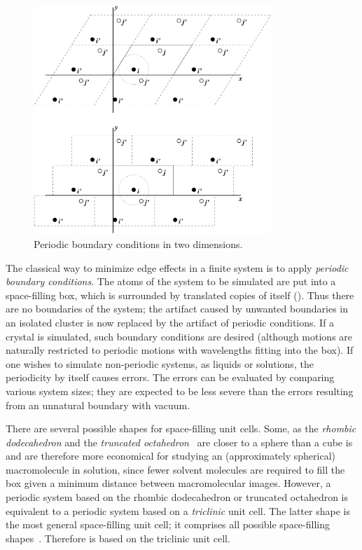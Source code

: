 \section{}
\label{sec:pbc}
\begin{figure}
\centerline{\includegraphics[width=9cm]{plots/pbctric}}
\caption {Periodic boundary conditions in two dimensions.}
\label{fig:pbc}
\end{figure}
The classical way to minimize edge effects in a finite system is to
apply {\em periodic boundary conditions}. The atoms of the system to
be simulated are put into a space-filling box, which is surrounded by
translated copies of itself ().  Thus there are no
boundaries of the system; the artifact caused by unwanted boundaries
in an isolated cluster is now replaced by the artifact of periodic
conditions. If a crystal is simulated, such boundary conditions are
desired (although motions are naturally restricted to periodic motions
with wavelengths fitting into the box). If one wishes to simulate
non-periodic systems, as liquids or solutions, the periodicity by
itself causes errors. The errors can be evaluated by comparing various
system sizes; they are expected to be less severe than the errors
resulting from an unnatural boundary with vacuum.

There are several possible shapes for space-filling unit cells. Some,
as the {\em rhombic dodecahedron} and the 
{\em truncated octahedron}~\cite{Adams79} are closer to a sphere
than a cube is and are therefore more economical for
studying an (approximately spherical) macromolecule in solution, since
fewer solvent molecules are required to fill the box given a minimum
distance between macromolecular images. However, a periodic system
based on the rhombic dodecahedron or truncated octahedron is equivalent
to a periodic system based on a {\em triclinic} unit cell.
The latter shape is the most general space-filling unit cell;
it comprises all possible space-filling shapes~\cite{Bekker95}.
Therefore {\gromacs} is based on the triclinic unit cell.
  
